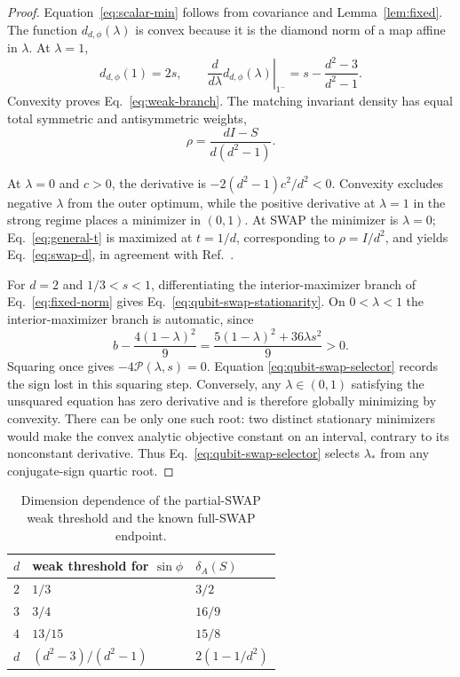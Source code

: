 \documentclass[11pt,a4paper]{article}
\theoremstyle{remark}
\begin{document}
\begin{proof}
Equation~\eqref{eq:scalar-min} follows from covariance and
Lemma~\ref{lem:fixed}.  The function $d_{d,\phi}(\lambda)$ is convex because it
is the diamond norm of a map affine in $\lambda$.  At $\lambda=1$,
\[
 d_{d,\phi}(1)=2s,\qquad
 \left.\frac{d}{d\lambda}d_{d,\phi}(\lambda)\right|_{1^-}
 =s-\frac{d^2-3}{d^2-1}.
\]
Convexity proves Eq.~\eqref{eq:weak-branch}.  The matching invariant density
has equal total symmetric and antisymmetric weights,
\[
 \rho=\frac{dI-S}{d(d^2-1)}.
\]

At $\lambda=0$ and $c>0$, the derivative is
$-2(d^2-1)c^2/d^2<0$.  Convexity excludes negative $\lambda$ from the outer
optimum, while the positive derivative at $\lambda=1$ in the strong regime
places a minimizer in $(0,1)$.  At SWAP the minimizer is $\lambda=0$;
Eq.~\eqref{eq:general-t} is maximized at $t=1/d$, corresponding to
$\rho=I/d^2$, and yields Eq.~\eqref{eq:swap-d}, in agreement with
Ref.~\cite{barsse2025}.

For $d=2$ and $1/3<s<1$, differentiating the interior-maximizer branch of
Eq.~\eqref{eq:fixed-norm} gives
Eq.~\eqref{eq:qubit-swap-stationarity}.  On $0<\lambda<1$ the interior-maximizer branch is automatic, since
\[
 b-\frac{4(1-\lambda)^2}{9}
 =\frac{5(1-\lambda)^2+36\lambda s^2}{9}>0.
\]
Squaring once gives $-4\mathcal P(\lambda,s)=0$.  Equation
\eqref{eq:qubit-swap-selector} records the sign lost in this squaring step.
Conversely, any $\lambda\in(0,1)$ satisfying the unsquared equation has zero
derivative and is therefore globally minimizing by convexity.  There can be
only one such root: two distinct stationary minimizers would make the convex
analytic objective constant on an interval, contrary to its nonconstant
derivative.  Thus Eq.~\eqref{eq:qubit-swap-selector} selects $\lambda_*$ from
any conjugate-sign quartic root.
\end{proof}

\begin{table}[t]
\centering
\caption{Dimension dependence of the partial-SWAP weak threshold and the known
full-SWAP endpoint.}
\label{tab:values}
\begin{tabular}{@{}lll@{}}
\toprule
$d$ & weak threshold for $\sin\phi$ & $\delta_A(S)$\\
\midrule
$2$ & $1/3$ & $3/2$\\
$3$ & $3/4$ & $16/9$\\
$4$ & $13/15$ & $15/8$\\
$d$ & $(d^2-3)/(d^2-1)$ & $2(1-1/d^2)$\\
\bottomrule
\end{tabular}
\end{table}
\end{document}
